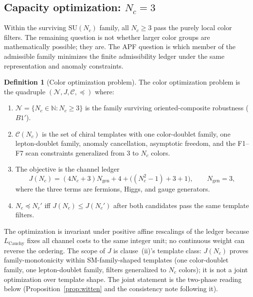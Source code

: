 \documentclass[11pt]{article}
\theoremstyle{definition}
\newtheorem{definition}[theorem]{Definition}
\newcommand{\SU}{\mathrm{SU}}
\begin{document}
\subsection{Capacity optimization: $N_c = 3$}
\label{sec:Nc_optimization}

Within the surviving $\SU(N_c)$ family, all $N_c\ge3$ pass the purely
local color filters.  The remaining question is not whether larger color
groups are mathematically possible; they are.  The APF question is which
member of the admissible family minimizes the finite admissibility ledger
under the same representation and anomaly constraints.

\begin{definition}[Color optimization problem]
\label{def:color_optimization}
The color optimization problem is the quadruple
$(\mathcal{N},J,\mathcal C,\preceq)$ where:
\begin{enumerate}[nosep,label=(\roman*),leftmargin=1.8em]
  \item $\mathcal{N}=\{N_c\in\mathbb N: N_c\ge3\}$ is the family surviving
  oriented-composite robustness ($B1'$).
  \item $\mathcal C(N_c)$ is the set of chiral templates with one
  color-doublet family, one lepton-doublet family, anomaly cancellation,
  asymptotic freedom, and the F1--F7 scan constraints generalized from
  $3$ to $N_c$ colors.
  \item The objective is the channel ledger
  \[
    J(N_c)=(4N_c+3)N_{\mathrm{gen}}+4+\bigl((N_c^2-1)+3+1\bigr),
    \qquad N_{\mathrm{gen}}=3,
  \]
  where the three terms are fermions, Higgs, and gauge generators.
  \item $N_c\preceq N_c'$ iff $J(N_c)\le J(N_c')$ after both candidates
  pass the same template filters.
\end{enumerate}
The optimization is invariant under positive affine rescalings of the
ledger because $L_{\mathrm{Cauchy}}$ fixes all channel costs to the same
integer unit; no continuous weight can reverse the ordering.
The scope of $J$ is clause~(ii)'s template class: $J(N_c)$ proves
family-monotonicity within SM-family-shaped templates (one
color-doublet family, one lepton-doublet family, filters generalized
to $N_c$ colors); it is not a joint optimization over template shape.
The joint statement is the two-phase reading below
(Proposition~\ref{prop:witten} and the consistency note following it).
\end{definition}
\end{document}
